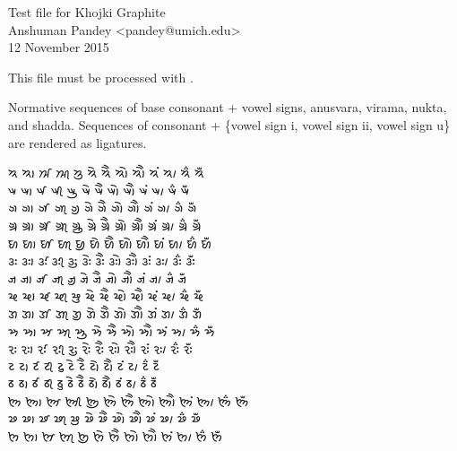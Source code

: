\documentclass[12pt]{article}
\begin{document}
Test file for Khojki Graphite \\ 
Anshuman Pandey <pandey@umich.edu> \\
12 November 2015
\vspace{.25in}

This file must be processed with \XeLaTeX{}.
\bigskip

Normative sequences of base consonant + vowel signs, anusvara, 
virama, nukta, and shadda. Sequences of consonant + 
\{vowel sign i, vowel sign ii, vowel sign u\} 
are rendered as ligatures. 
\bigskip

{\Large\khoj 
𑈈 𑈈𑈬 𑈈𑈭 𑈈𑈮 𑈈𑈯 𑈈𑈰 𑈈𑈱 𑈈𑈲 𑈈𑈳 𑈈𑈴 𑈈𑈵 𑈈𑈶 𑈈𑈷 \\ 

𑈉 𑈉𑈬 𑈉𑈭 𑈉𑈮 𑈉𑈯 𑈉𑈰 𑈉𑈱 𑈉𑈲 𑈉𑈳 𑈉𑈴 𑈉𑈵 𑈉𑈶 𑈉𑈷 \\ 

𑈊 𑈊𑈬 𑈊𑈭 𑈊𑈮 𑈊𑈯 𑈊𑈰 𑈊𑈱 𑈊𑈲 𑈊𑈳 𑈊𑈴 𑈊𑈵 𑈊𑈶 𑈊𑈷 \\ 

𑈋 𑈋𑈬 𑈋𑈭 𑈋𑈮 𑈋𑈯 𑈋𑈰 𑈋𑈱 𑈋𑈲 𑈋𑈳 𑈋𑈴 𑈋𑈵 𑈋𑈶 𑈋𑈷 \\ 

𑈌 𑈌𑈬 𑈌𑈭 𑈌𑈮 𑈌𑈯 𑈌𑈰 𑈌𑈱 𑈌𑈲 𑈌𑈳 𑈌𑈴 𑈌𑈵 𑈌𑈶 𑈌𑈷 \\ 

𑈍 𑈍𑈬 𑈍𑈭 𑈍𑈮 𑈍𑈯 𑈍𑈰 𑈍𑈱 𑈍𑈲 𑈍𑈳 𑈍𑈴 𑈍𑈵 𑈍𑈶 𑈍𑈷 \\ 

𑈎 𑈎𑈬 𑈎𑈭 𑈎𑈮 𑈎𑈯 𑈎𑈰 𑈎𑈱 𑈎𑈲 𑈎𑈳 𑈎𑈴 𑈎𑈵 𑈎𑈶 𑈎𑈷 \\ 

𑈏 𑈏𑈬 𑈏𑈭 𑈏𑈮 𑈏𑈯 𑈏𑈰 𑈏𑈱 𑈏𑈲 𑈏𑈳 𑈏𑈴 𑈏𑈵 𑈏𑈶 𑈏𑈷 \\ 

𑈐 𑈐𑈬 𑈐𑈭 𑈐𑈮 𑈐𑈯 𑈐𑈰 𑈐𑈱 𑈐𑈲 𑈐𑈳 𑈐𑈴 𑈐𑈵 𑈐𑈶 𑈐𑈷 \\ 

𑈑 𑈑𑈬 𑈑𑈭 𑈑𑈮 𑈑𑈯 𑈑𑈰 𑈑𑈱 𑈑𑈲 𑈑𑈳 𑈑𑈴 𑈑𑈵 𑈑𑈶 𑈑𑈷 \\ 


𑈓 𑈓𑈬 𑈓𑈭 𑈓𑈮 𑈓𑈯 𑈓𑈰 𑈓𑈱 𑈓𑈲 𑈓𑈳 𑈓𑈴 𑈓𑈵 𑈓𑈶 𑈓𑈷 \\ 

𑈔 𑈔𑈬 𑈔𑈭 𑈔𑈮 𑈔𑈯 𑈔𑈰 𑈔𑈱 𑈔𑈲 𑈔𑈳 𑈔𑈴 𑈔𑈵 𑈔𑈶 𑈔𑈷 \\ 

𑈕 𑈕𑈬 𑈕𑈭 𑈕𑈮 𑈕𑈯 𑈕𑈰 𑈕𑈱 𑈕𑈲 𑈕𑈳 𑈕𑈴 𑈕𑈵 𑈕𑈶 𑈕𑈷 \\ 

𑈖 𑈖𑈬 𑈖𑈭 𑈖𑈮 𑈖𑈯 𑈖𑈰 𑈖𑈱 𑈖𑈲 𑈖𑈳 𑈖𑈴 𑈖𑈵 𑈖𑈶 𑈖𑈷 \\ 

𑈗 𑈗𑈬 𑈗𑈭 𑈗𑈮 𑈗𑈯 𑈗𑈰 𑈗𑈱 𑈗𑈲 𑈗𑈳 𑈗𑈴 𑈗𑈵 𑈗𑈶 𑈗𑈷 \\ 

𑈘 𑈘𑈬 𑈘𑈭 𑈘𑈮 𑈘𑈯 𑈘𑈰 𑈘𑈱 𑈘𑈲 𑈘𑈳 𑈘𑈴 𑈘𑈵 𑈘𑈶 𑈘𑈷 \\ 

}
\end{document}

